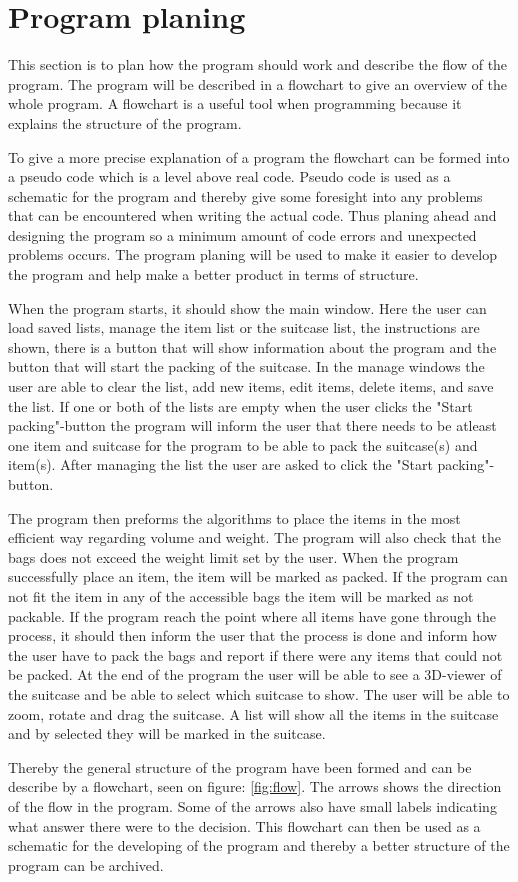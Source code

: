 \section{Program planing}
This section is to plan how the program should work and describe the flow of the program. The program will be described in a flowchart to give an overview of the whole program. A flowchart is a useful tool when programming because it explains the structure of the program.

To give a more precise explanation of a program the flowchart can be formed into a pseudo code which is a level above real code. Pseudo code is used as a schematic for the program and thereby give some foresight into any problems that can be encountered when writing the actual code. Thus planing ahead and designing the program so a minimum amount of code errors and unexpected problems occurs.
The program planing will be used to make it easier to develop the program and help make a better product in terms of structure.

When the program starts, it should show the main window. Here the user can load saved lists, manage the item list or the suitcase list, the instructions are shown, there is a button that will show information about the program and the button that will start the packing of the suitcase. In the manage windows the user are able to clear the list, add new items, edit items, delete items, and save the list. If one or both of the lists are empty when the user clicks the "Start packing"-button the program will inform the user that there needs to be atleast one item and suitcase for the program to be able to pack the suitcase(s) and item(s). After managing the list the user are asked to click the "Start packing"-button.

The program then preforms the algorithms to place the items in the most efficient way regarding volume and weight. The program will also check that the bags does not exceed the weight limit set by the user.
When the program successfully place an item, the item will be marked as packed. If the program can not fit the item in any of the accessible bags the item will be marked as not packable. If the program reach the point where all items have gone through the process, it should then inform the user that the process is done and inform how the user have to pack the bags and report if there were any items that could not be packed.
At the end of the program the user will be able to see a 3D-viewer of the suitcase and be able to select which suitcase to show. The user will be able to zoom, rotate and drag the suitcase. A list will show all the items in the suitcase and by selected they will be marked in the suitcase.


Thereby the general structure of the program have been formed and can be describe by a flowchart, seen on figure: \ref{fig:flow}.
The arrows shows the direction of the flow in the program. Some of the arrows also have small labels indicating what answer there were to the decision.
This flowchart can then be used as a schematic for the developing of the program and thereby a better structure of the program can be archived.